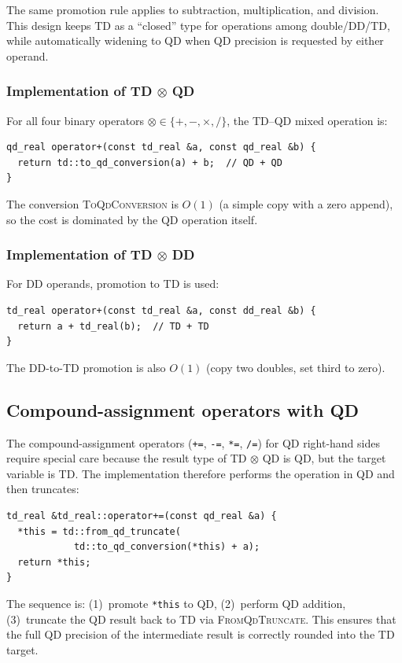 \documentclass[11pt,a4paper]{article}
\begin{document}
The same promotion rule applies to subtraction, multiplication,
and division.  This design keeps TD as a ``closed'' type for
operations among double/DD/TD, while automatically widening to QD
when QD precision is requested by either operand.

\subsubsection{Implementation of TD $\otimes$ QD}

For all four binary operators $\otimes \in \{+, -, \times, /\}$,
the TD--QD mixed operation is:
\begin{lstlisting}
qd_real operator+(const td_real &a, const qd_real &b) {
  return td::to_qd_conversion(a) + b;  // QD + QD
}
\end{lstlisting}
The conversion \textsc{ToQdConversion} is $O(1)$ (a simple copy
with a zero append), so the cost is dominated by the QD operation
itself.

\subsubsection{Implementation of TD $\otimes$ DD}

For DD operands, promotion to TD is used:
\begin{lstlisting}
td_real operator+(const td_real &a, const dd_real &b) {
  return a + td_real(b);  // TD + TD
}
\end{lstlisting}
The DD-to-TD promotion is also $O(1)$ (copy two doubles, set third
to zero).

\subsection{Compound-assignment operators with QD}

The compound-assignment operators (\texttt{+=}, \texttt{-=},
\texttt{*=}, \texttt{/=}) for QD right-hand sides require special
care because the result type of TD $\otimes$ QD is QD, but the
target variable is TD.  The implementation therefore performs the
operation in QD and then truncates:
\begin{lstlisting}
td_real &td_real::operator+=(const qd_real &a) {
  *this = td::from_qd_truncate(
            td::to_qd_conversion(*this) + a);
  return *this;
}
\end{lstlisting}
The sequence is: (1)~promote \texttt{*this} to QD, (2)~perform QD
addition, (3)~truncate the QD result back to TD via
\textsc{FromQdTruncate}.  This ensures that the full QD precision
of the intermediate result is correctly rounded into the TD target.
\end{document}

